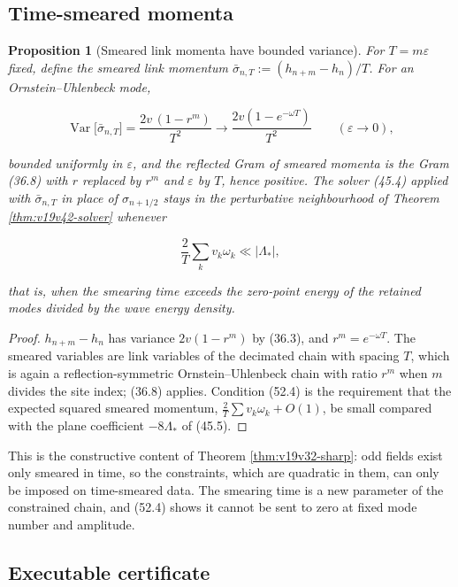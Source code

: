 \documentclass[11pt]{article}
\newtheorem{proposition}[theorem]{Proposition}
\theoremstyle{remark}
\begin{document}
\subsection{Time-smeared momenta}

\begin{proposition}[Smeared link momenta have bounded variance]
\label{prop:v19v49-smearing}
For \(T=m\varepsilon\) fixed, define the smeared link momentum
\(\bar\sigma_{n,T}:=(h_{n+m}-h_n)/T\).  For an Ornstein--Uhlenbeck mode,

\[
 \operatorname{Var}\bigl[\bar\sigma_{n,T}\bigr]=\frac{2v\,(1-r^m)}{T^2}
 \longrightarrow\frac{2v(1-e^{-\omega T})}{T^2}\qquad(\varepsilon\to0),
                                                                    \tag{52.3}
\]

bounded uniformly in \(\varepsilon\), and the reflected Gram of smeared
momenta is the Gram (36.8) with \(r\) replaced by \(r^m\) and
\(\varepsilon\) by \(T\), hence positive.  The solver (45.4) applied
with \(\bar\sigma_{n,T}\) in place of \(\sigma_{n+1/2}\) stays in the
perturbative neighbourhood of Theorem \ref{thm:v19v42-solver} whenever

\[
 \frac{2}{T}\sum_kv_k\omega_k\ll|\Lambda_*|,                            \tag{52.4}
\]

that is, when the smearing time exceeds the zero-point energy of the
retained modes divided by the wave energy density.
\end{proposition}

\begin{proof}
\(h_{n+m}-h_n\) has variance \(2v(1-r^m)\) by (36.3), and
\(r^m=e^{-\omega T}\).  The smeared variables are link variables of the
decimated chain with spacing \(T\), which is again a reflection-symmetric
Ornstein--Uhlenbeck chain with ratio \(r^m\) when \(m\) divides the
site index; (36.8) applies.  Condition (52.4) is the requirement that
the expected squared smeared momentum, \(\tfrac2T\sum v_k\omega_k+O(1)\),
be small compared with the plane coefficient \(-8\Lambda_*\) of
(45.5).
\end{proof}

This is the constructive content of Theorem \ref{thm:v19v32-sharp}:
odd fields exist only smeared in time, so the constraints, which are
quadratic in them, can only be imposed on time-smeared data.  The
smearing time is a new parameter of the constrained chain, and (52.4)
shows it cannot be sent to zero at fixed mode number and amplitude.

\subsection{Executable certificate}
\end{document}
